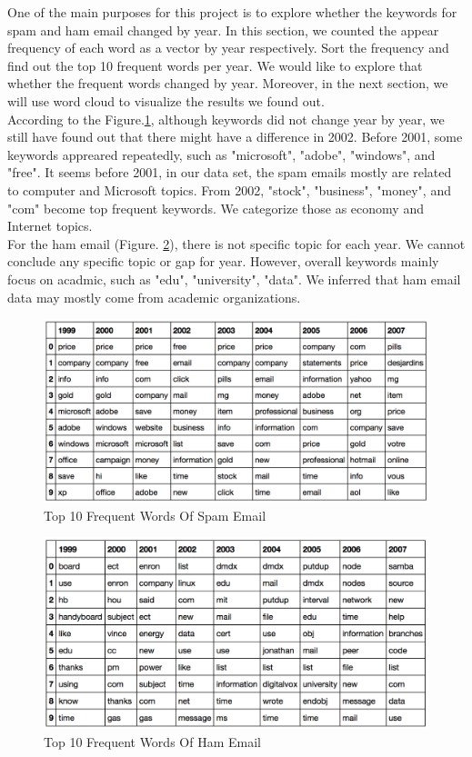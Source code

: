 
One of the main purposes for this project is to explore whether the keywords for spam and ham email changed by year. In this section, we counted the appear frequency of each word as a vector by year respectively. Sort the frequency and find out the top 10 frequent words per year. We would like to explore that whether the frequent words changed by year. Moreover, in the next section, we will use word cloud to visualize the results we found out.\\

According to the Figure.\ref{topwordspam}, although keywords did not change year by year, we still have found out that there might have a difference in 2002. Before 2001, some keywords appreared repeatedly, such as "microsoft", "adobe", "windows", and "free". It seems before 2001, in our data set, the spam emails mostly are related to computer and Microsoft topics. From 2002, "stock", "business", "money", and  "com" become top frequent keywords. We categorize those as economy and Internet topics. \\

For the ham email (Figure. \ref{topwordham}), there is not specific topic for each year. We cannot conclude any specific topic or gap for year. However, overall keywords mainly focus on acadmic, such as "edu", "university", "data". We inferred that ham email data may mostly come from academic organizations.\\

\begin{figure}[H]
    \centering
    \includegraphics[width=13cm]{./plots/top_word_spam.png}
    \caption{Top 10 Frequent Words Of Spam Email}
    \label{topwordspam}
\end{figure}


\begin{figure}[H]
    \centering
    \includegraphics[width=13cm]{./plots/top_word_ham.png}
    \caption{Top 10 Frequent Words Of Ham Email}
    \label{topwordham}
\end{figure}


